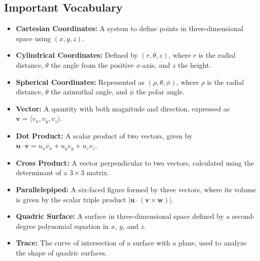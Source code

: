 \newpage


\formsdefs{}

\subsection*{Important Vocabulary}
\begin{itemize}
    \item \textbf{Cartesian Coordinates:} A system to define points in three-dimensional space using \((x, y, z)\).
    \item \textbf{Cylindrical Coordinates:} Defined by \((r, \theta, z)\), where \(r\) is the radial distance, \(\theta\) the angle from the positive \(x\)-axis, and \(z\) the height.
    \item \textbf{Spherical Coordinates:} Represented as \((\rho, \theta, \phi)\), where \(\rho\) is the radial distance, \(\theta\) the azimuthal angle, and \(\phi\) the polar angle.
    \item \textbf{Vector:} A quantity with both magnitude and direction, expressed as \(\mathbf{v} = \langle v_x, v_y, v_z \rangle\).
    \item \textbf{Dot Product:} A scalar product of two vectors, given by \(\mathbf{u} \cdot \mathbf{v} = u_x v_x + u_y v_y + u_z v_z\).
    \item \textbf{Cross Product:} A vector perpendicular to two vectors, calculated using the determinant of a \(3 \times 3\) matrix.
    \item \textbf{Parallelepiped:} A six-faced figure formed by three vectors, where its volume is given by the scalar triple product \(|\mathbf{u} \cdot (\mathbf{v} \times \mathbf{w})|\).
    \item \textbf{Quadric Surface:} A surface in three-dimensional space defined by a second-degree polynomial equation in \( x \), \( y \), and \( z \).
    \item \textbf{Trace:} The curve of intersection of a surface with a plane, used to analyze the shape of quadric surfaces.
\end{itemize}

